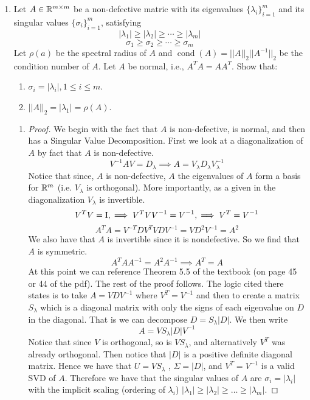 \documentclass{article}
\DeclareMathOperator{\cond}{cond}
\begin{document}
\begin{enumerate}
\begin{proof}
\end{proof}

\item %
Let $A \in \mathbb{R}^{m\times m}$ be a non-defective matric with its eigenvalues $\{\lambda_i\}_{i=1}^m$ and its singular values $\{\sigma_i\}_{i=1}^m$, satisfying
\[
    |\lambda_1| \ge |\lambda_2| \ge \cdots \ge |\lambda_m|
\]
\[
    \sigma_1 \ge \sigma_2 \ge \cdots \ge \sigma_m
\]
Let $\rho(a)$ be the spectral radius of $A$ and $\cond(A) = ||A||_2||A^{-1}||_2$ be the condition number of $A$. Let $A$ be normal, i.e., $A^TA = AA^T$. Show that: 
\begin{enumerate}
\item $\sigma_i = |\lambda_i|, 1 \le i \le m$.

\item $||A||_2 = |\lambda_1| = \rho(A)$. 
\end{enumerate}

\begin{enumerate}

\item 
\begin{proof}
    We begin with the fact that $A$ is non-defective, is normal, and then has a Singular Value Decomposition. First we look at a diagonalization of $A$ by fact that $A$ is non-defective. 
    \[
        V^{-1}AV = D_{\lambda} \implies A = V_{\lambda}D_{\lambda}V_{\lambda}^{-1}
    \]
    Notice that since, $A$ is non-defective, $A$ the eigenvalues of $A$ form a basis for $\mathbb{R}^m$ (i.e. $V_{\lambda}$ is orthogonal). More importantly, as a given in the diagonalization $V_{\lambda}$ is invertible. 
    \[ 
        V^TV = \mathrm{I}, \implies  V^TVV^{-1} = V^{-1}, \implies  V^T = V^{-1}
    \]
    \[
        A^TA = V^{-T}DV^TVDV^{-1} = VD^2V^{-1} = A^2
    \]
    We also have that $A$ is invertible since it is nondefective. So we find that $A$ is symmetric. 
    \[
        A^TAA^{-1} = A^2A^{-1} \implies A^T = A
    \]
    At this point we can reference Theorem 5.5 of the textbook (on page 45 or 44 of the pdf). The rest of the proof follows. The logic cited there states is to take $A = VDV^{-1}$ where $V^T = V^{-1}$ and then to create a matrix $S_{\lambda}$ which is a diagonal matrix with only the signs of each eigenvalue on $D$ in the diagonal. That is we can decompose $D = S_{\lambda}|D|$. We then write
    \[
        A = VS_{\lambda}|D|V^{-1}
    \]
    Notice that since $V$ is orthogonal, so is $VS_{\lambda}$, and alternatively $V^T$ was already orthogonal. Then notice that $|D|$ is a positive definite diagonal matrix. Hence we have that $U = VS_{\lambda}$ , $\Sigma = |D|$, and $V^T = V^{-1}$ is a valid SVD of $A$. Therefore we have that the singular values of $A$ are $\sigma_i = |\lambda_i|$ with the implicit scaling (ordering of $\lambda_i$) $|\lambda_1| \ge |\lambda_2| \ge \dotsc \ge |\lambda_m|$.


\end{proof}
\end{enumerate}
\end{enumerate}
\end{document}
